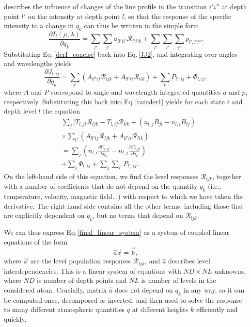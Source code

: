 \documentclass[referee]{aa}
\begin{document}
describes the influence of changes of the line profile in the transition $i'i''$ at depth point $l'$ on the intensity at depth point $l$, so that the response of the specific intensity to a change in $q_k$ can thus be written in the simple form
\begin{equation} 
 \frac{\partial I_l(\mu,\lambda)}{\partial q_k} = \sum_{l'} \sum_{i'} a_{ll'ii'} {\mathcal R}_{l'i'k} + \sum_{l'}\sum_{i'}\sum_{i''} p_{l',i'i''}.
 \label{derI_concise}
\end{equation}
Substituting Eq.\,\ref{derI_concise} back into Eq.\,\ref{JJ2}, and integrating over angles and wavelengths yields
\begin{equation}
 \frac{\partial J_{l,ij}}{\partial q_k} = \sum_{l'} (A_{ll'ij} {\mathcal R}_{ljk}+ A_{ll'ii} {\mathcal R}_{lik}) + \sum_{l'} P_{l',ij} + \Phi_{l,ij}
,\end{equation}
where $A$ and $P$ correspond to angle and wavelength integrated quantities $a$ and $p$, respectively. Substituting this back into Eq.\,\ref{rateder1} yields for each state $i$ and depth level $l$ the equation
\begin{align}
&\sum_j  [ T_{l,ji}\mathcal{R}_{ljk} - T_{l,ij}\mathcal{R}_{lik} + 
(n_{l,j}B_{ji} - n_{l,i}B_{ij})  \nonumber \\
& \times \sum_{l'} (A_{ll'ij} {\mathcal R}_{ljk}+ A_{ll'ii} {\mathcal R}_{lik}) \nonumber \\
& = \sum_j (n_{l,i} \frac{\partial C_{l,ij}}{\partial q_k} - n_{l,j} \frac{\partial C_{l,ji}}{\partial q_k}) \nonumber \\
& + \sum_j \Phi_{l,ij} + \sum_j \sum_{l'} P_{l',ij}.
 \label{final_linear_system}
\end{align}
On the left-hand side of this equation, we find the level responses ${\mathcal R}_{ljk}$, together with a number of coefficients that do not depend on the quantity $q_k$ (i.e., temperature, velocity, magnetic field...) with respect to which we have taken the derivative. The right-hand side  contains all the other terms, including those that are explicitly dependent on $q_k$, but no terms that depend on  ${\mathcal R}_{ljk}$. 

We can thus express Eq.\,\ref{final_linear_system} as a system of coupled linear equations of the form
\begin{equation}
 \hat{a} \vec{x} = \vec{b},
\end{equation}
where $\vec{x}$ are the level population responses ${\mathcal R}_{ljk}$, and $\hat{a}$ describes level interdependencies. This is a linear system of equations with $ND \times NL$ unknowns, where $ND$ is number of depth points and $NL$ is number of levels in the considered atom. Crucially, matrix $\hat{a}$ does not depend on $q_k$ in any way, so it can be computed once, decomposed or inverted, and then used to solve the response to many different atmospheric quantities $q$ at different heights $k$ efficiently and quickly. 
\end{document}

